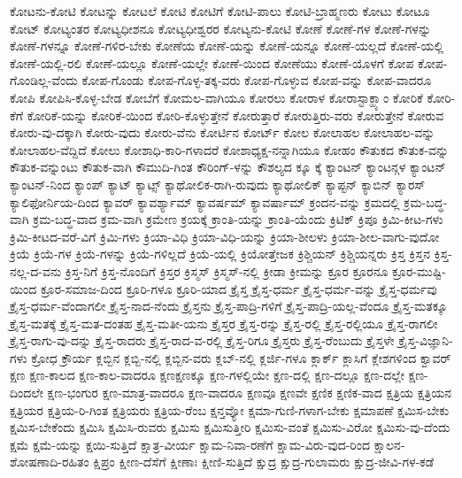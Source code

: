 {ಕೋಟನು-ಕೋಟಿ
ಕೋಟನ್ನು
ಕೋಟಲೆ
ಕೋಟಿ
ಕೋಟಿಗೆ
ಕೋಟಿ-ಪಾಲು
ಕೋಟಿ-ಬ್ರಾಹ್ಮಣರು
ಕೋಟು
ಕೋಟೂ
ಕೋಟ್
ಕೋಟ್ಯಂತರ
ಕೋಟ್ಯಧೀಶನೂ
ಕೋಟ್ಯಧೀಶ್ವರರ
ಕೋಟ್ಯನು-ಕೋಟಿ
ಕೋಣೆ
ಕೋಣೆ-ಗಳ
ಕೋಣೆ-ಗಳನ್ನು
ಕೋಣೆ-ಗಳನ್ನೂ
ಕೋಣೆ-ಗಳಿರ-ಬೇಕು
ಕೋಣೆಯ
ಕೋಣೆ-ಯನ್ನು
ಕೋಣೆ-ಯನ್ನೂ
ಕೋಣೆ-ಯಲ್ಲದೆ
ಕೋಣೆ-ಯಲ್ಲಿ
ಕೋಣೆ-ಯಲ್ಲಿ-ರಲಿ
ಕೋಣೆ-ಯಲ್ಲೂ
ಕೋಣೆ-ಯಲ್ಲೇ
ಕೋಣೆ-ಯಿಂದ
ಕೋಣೆಯು
ಕೋಣೆ-ಯೊಳಗೆ
ಕೋಪ
ಕೋಪ-ಗೊಂಡಿಲ್ಲ-ವೆಂದು
ಕೋಪ-ಗೊಂಡು
ಕೋಪ-ಗೊಳ್ಳ-ತಕ್ಕ-ವರು
ಕೋಪ-ಗೊಳ್ಳುವ
ಕೋಪ-ವನ್ನು
ಕೋಪ-ವಾದರೂ
ಕೋಪಿ
ಕೋಪಿಸಿ-ಕೊಳ್ಳ-ಬೇಡ
ಕೋಬೆಗೆ
ಕೋಮಲ-ವಾಗಿಯೂ
ಕೋರಲು
ಕೋರಾಳ
ಕೋರಾಸ್ಟಾಕ್ಹ್ಯಾಂ
ಕೋರಿಕೆ
ಕೋರಿ-ಕೆಗೆ
ಕೋರಿಕೆ-ಯನ್ನು
ಕೋರಿಕೆ-ಯಿಂದ
ಕೋರಿ-ಕೊಳ್ಳುತ್ತೇನೆ
ಕೋರುತ್ತಾರೆ
ಕೋರುತ್ತಿರು-ವರು
ಕೋರುತ್ತೇನೆ
ಕೋರುವ
ಕೋರು-ವು-ದಕ್ಕಾಗಿ
ಕೋರು-ವುದು
ಕೋರು-ವೆನು
ಕೋರ್ಟಿನ
ಕೋರ್ಟ್
ಕೋಲ
ಕೋಲಾಹಲ
ಕೋಲಾಹಲ-ವನ್ನು
ಕೋಲಾಹಲ-ವೆದ್ದಿದೆ
ಕೋಲು
ಕೋಶಾಧಿ-ಕಾರಿ-ಗಳಾದರೆ
ಕೋಶಾಧ್ಯಕ್ಷ-ನನ್ನಾಗಿಯೂ
ಕೋಹಂ
ಕೌತುಕದ
ಕೌತುಕ-ವನ್ನು
ಕೌತುಕ-ವನ್ನುಂಟು
ಕೌತುಕ-ವಾಗಿ
ಕೌಮುದಿ-ಗಿಂತ
ಕೌರಿಂಗ್-ಳನ್ನು
ಕೌಶಲ್ಯದ
ಕ್ಕೂ
ಕ್ಕೆ
ಕ್ಯಾಂಟನ್
ಕ್ಯಾಂಟನ್ಗಳ
ಕ್ಯಾಂಟನ್
ಕ್ಯಾಂಟನ್-ನಿಂದ
ಕ್ಯಾಂಪ್
ಕ್ಯಾಟ್
ಕ್ಯಾಟ್ಸ್
ಕ್ಯಾಥೋಲಿಕ-ರಾಗಿ-ರುವುದು
ಕ್ಯಾಥೋಲಿಕ್
ಕ್ಯಾಪ್ಟನ್
ಕ್ಯಾಬಿನ್
ಕ್ಯಾರಸ್
ಕ್ಯಾಲಿಫೋರ್ನಿಯ-ದಿಂದ
ಕ್ಯಾವರ್
ಕ್ಯಾವರ್ಶ್ಯಾಮ್
ಕ್ಯಾವರ್ಷಮ್
ಕ್ಯಾವರ್ಷಾಮ್
ಕ್ರಂದನ-ವನ್ನು
ಕ್ರಮದಲ್ಲಿ
ಕ್ರಮ-ಬದ್ಧ-ವಾಗಿ
ಕ್ರಮ-ಬದ್ಧ-ವಾದ
ಕ್ರಮ-ವಾಗಿ
ಕ್ರಮೇಣ
ಕ್ರಯಕ್ಕೆ
ಕ್ರಾಂತಿ-ಯನ್ನು
ಕ್ರಾಂತಿ-ಯೆಂದು
ಕ್ರಿಟಿಕ್
ಕ್ರಿಪೂ
ಕ್ರಿಮಿ-ಕೀಟ-ಗಳು
ಕ್ರಿಮಿ-ಕೀಟದ-ವರೆ-ವಿಗೆ
ಕ್ರಿಮಿ-ಗಳು
ಕ್ರಿಯಾ-ವಿಧಿ
ಕ್ರಿಯಾ-ವಿಧಿ-ಯನ್ನು
ಕ್ರಿಯಾ-ಶೀಲಳು
ಕ್ರಿಯಾ-ಶೀಲ-ವಾಗು-ವುದೋ
ಕ್ರಿಯೆ
ಕ್ರಿಯೆ-ಗಳ
ಕ್ರಿಯೆ-ಗಳನ್ನು
ಕ್ರಿಯೆ-ಗಳಿಲ್ಲದೆ
ಕ್ರಿಯೆ-ಯಲ್ಲಿ
ಕ್ರಿಯೋತ್ತೇಜಕ
ಕ್ರಿಶ್ಚಿಯನ್
ಕ್ರಿಶ್ಚಿಯನ್ನರು
ಕ್ರಿಸ್ತ
ಕ್ರಿಸ್ತನ
ಕ್ರಿಸ್ತ-ನಲ್ಲ-ದ-ವನು
ಕ್ರಿಸ್ತ-ನಿಗೆ
ಕ್ರಿಸ್ತ-ನೊಂದಿಗೆ
ಕ್ರಿಸ್ತರ
ಕ್ರಿಸ್ಮಸ್
ಕ್ರಿಸ್ಮಸ್-ನಲ್ಲಿ
ಕ್ರೀಡಾ
ಕ್ರೀಮನ್ನು
ಕ್ರೂರ
ಕ್ರೂರನೂ
ಕ್ರೂರ-ಮುಷ್ಟಿ-ಯಿಂದ
ಕ್ರೂರ-ಸಮಾಜ-ದಿಂದ
ಕ್ರೂರಿ-ಗಳೂ
ಕ್ರೂರಿ-ಯಾದ
ಕ್ರೈಸ್ತ
ಕ್ರೈಸ್ತ-ಧರ್ಮ
ಕ್ರೈಸ್ತ-ಧರ್ಮ-ವನ್ನು
ಕ್ರೈಸ್ತ-ಧರ್ಮವು
ಕ್ರೈಸ್ತ-ಧರ್ಮ-ವೆಂದಾಗಲೀ
ಕ್ರೈಸ್ತ-ನಾದ-ನೆಂದು
ಕ್ರೈಸ್ತನು
ಕ್ರೈಸ್ತ-ಪಾದ್ರಿ-ಗಳಿಗೆ
ಕ್ರೈಸ್ತ-ಪಾದ್ರಿ-ಯಲ್ಲ-ವೆಂದೂ
ಕ್ರೈಸ್ತ-ಮತಕ್ಕೂ
ಕ್ರೈಸ್ತ-ಮತಕ್ಕೆ
ಕ್ರೈಸ್ತ-ಮತ-ದಂತಹ
ಕ್ರೈಸ್ತ-ಮತೀ-ಯನು
ಕ್ರೈಸ್ತರ
ಕ್ರೈಸ್ತ-ರನ್ನು
ಕ್ರೈಸ್ತ-ರಲ್ಲಿ
ಕ್ರೈಸ್ತ-ರಲ್ಲಿಯೂ
ಕ್ರೈಸ್ತ-ರಾಗಲೀ
ಕ್ರೈಸ್ತ-ರಾಗು-ವು-ದನ್ನು
ಕ್ರೈಸ್ತ-ರಾದರು
ಕ್ರೈಸ್ತ-ರಾದ-ವ-ರಲ್ಲಿ
ಕ್ರೈಸ್ತ-ರಿಗೂ
ಕ್ರೈಸ್ತರು
ಕ್ರೈಸ್ತ-ರೆಂಬುದು
ಕ್ರೈಸ್ತಳೇ
ಕ್ರೈಸ್ತ-ವಿಜ್ಞಾನಿ-ಗಳು
ಕ್ರೋಧ
ಕ್ರೌರ್ಯ
ಕ್ಲಬ್ಬಿನ
ಕ್ಲಬ್ಬಿ-ನಲ್ಲಿ
ಕ್ಲಬ್ಬಿನ-ವರು
ಕ್ಲಬ್-ನಲ್ಲಿ
ಕ್ಲರ್ಜಿ-ಗಳೂ
ಕ್ಲಾರ್ಕ್
ಕ್ಲಾಸಿಗೆ
ಕ್ಲೇಶಗಳಿಂದ
ಕ್ವಾವರ್
ಕ್ಷಣ
ಕ್ಷಣ-ಕಾಲದ
ಕ್ಷಣ-ಕಾಲ-ವಾದರೂ
ಕ್ಷಣಕ್ಷಣಕ್ಕೂ
ಕ್ಷಣ-ಗಳಲ್ಲಿಯೇ
ಕ್ಷಣ-ದಲ್ಲಿ
ಕ್ಷಣ-ದಲ್ಲೂ
ಕ್ಷಣ-ದಲ್ಲೇ
ಕ್ಷಣ-ದಿಂದಲೇ
ಕ್ಷಣ-ಭಂಗುರ
ಕ್ಷಣ-ಮಾತ್ರ-ವಾದರೂ
ಕ್ಷಣ-ವಾದರೂ
ಕ್ಷಣವೂ
ಕ್ಷಣವೇ
ಕ್ಷಣಿಕ
ಕ್ಷಣಿಕ-ವಾದ
ಕ್ಷತ್ರಿಯ
ಕ್ಷತ್ರಿಯನ
ಕ್ಷತ್ರಿಯರ
ಕ್ಷತ್ರಿಯ-ರಿ-ಗಿಂತ
ಕ್ಷತ್ರಿಯರು
ಕ್ಷತ್ರಿಯ-ರೆಂಬ
ಕ್ಷನ್ತವ್ಯೋ
ಕ್ಷಮಾ-ಗುಣಿ-ಗಳಾಗ-ಬೇಕು
ಕ್ಷಮಾಪಣೆ
ಕ್ಷಮಿಸ-ಬೇಕು
ಕ್ಷಮಿಸ-ಬೇಕೆಂದು
ಕ್ಷಮಿಸಿ
ಕ್ಷಮಿಸಿ-ರುವರು
ಕ್ಷಮಿಸು
ಕ್ಷಮಿಸುತ್ತೀರಿ
ಕ್ಷಮಿಸು-ವಂತೆ
ಕ್ಷಮಿಸು-ವಿರೋ
ಕ್ಷಮಿಸು-ವು-ದೆಂದು
ಕ್ಷಮೆ
ಕ್ಷಮೆ-ಯನ್ನು
ಕ್ಷಯಿ-ಸುತ್ತಿದೆ
ಕ್ಷಾತ್ರ-ವೀರ್ಯ
ಕ್ಷಾಮ-ನಿವಾ-ರಣೆಗೆ
ಕ್ಷಾಮ-ವಿರು-ವುದ-ರಿಂದ
ಕ್ಷಾಲನ-ಶೋಷಣಾದಿ-ರಹಿತಂ
ಕ್ಷಿಪ್ರಂ
ಕ್ಷೀಣ-ದೆಸೆಗೆ
ಕ್ಷೀಣಾಃ
ಕ್ಷೀಣಿ-ಸುತ್ತಿದೆ
ಕ್ಷುದ್ರ
ಕ್ಷುದ್ರ-ಗುಲಾಮರು
ಕ್ಷುದ್ರ-ಜೀವಿ-ಗಳ-ಕಡೆ
}
